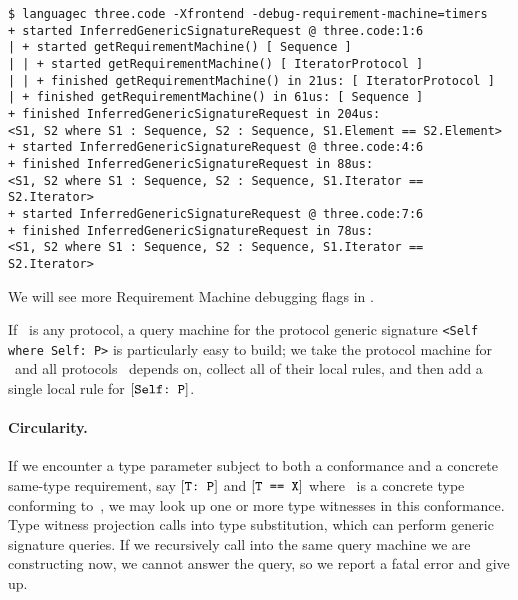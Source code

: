 \documentclass[../generics]{subfiles}
\begin{document}
\begin{example}
\begin{Verbatim}[fontsize=\footnotesize,numbers=none]
$ languagec three.code -Xfrontend -debug-requirement-machine=timers
+ started InferredGenericSignatureRequest @ three.code:1:6
| + started getRequirementMachine() [ Sequence ]
| | + started getRequirementMachine() [ IteratorProtocol ]
| | + finished getRequirementMachine() in 21us: [ IteratorProtocol ]
| + finished getRequirementMachine() in 61us: [ Sequence ]
+ finished InferredGenericSignatureRequest in 204us:
<S1, S2 where S1 : Sequence, S2 : Sequence, S1.Element == S2.Element>
+ started InferredGenericSignatureRequest @ three.code:4:6
+ finished InferredGenericSignatureRequest in 88us:
<S1, S2 where S1 : Sequence, S2 : Sequence, S1.Iterator == S2.Iterator>
+ started InferredGenericSignatureRequest @ three.code:7:6
+ finished InferredGenericSignatureRequest in 78us:
<S1, S2 where S1 : Sequence, S2 : Sequence, S1.Iterator == S2.Iterator>
\end{Verbatim}
We will see more Requirement Machine debugging flags in .
\end{example}

\begin{example}
If \tP\ is any protocol, a query machine for the protocol generic signature \verb|<Self where Self: P>| is particularly easy to build; we take the protocol machine for \tP\ and all protocols \tP\ depends on, collect all of their local rules, and then add a single local rule for $[\texttt{Self:~P}]$.
\end{example}

\paragraph{Circularity.}
If we encounter a type parameter subject to both a conformance and a concrete same-type requirement, say $[\texttt{T:~P}]$ and $[\texttt{T == X}]$ where \tX\ is a concrete type conforming to~\tP, we may look up one or more type witnesses in this conformance. Type witness projection calls into type substitution, which can perform generic signature queries. If we recursively call into the same query machine we are constructing now, we cannot answer the query, so we report a fatal error and give up.
\end{document}
